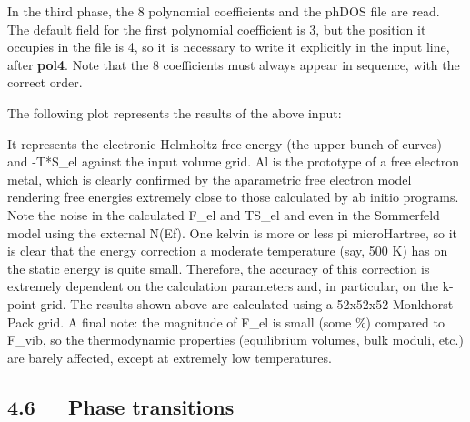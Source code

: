 \documentclass[a4paper]{article}
\begin{document}
In the third phase, the 8 polynomial coefficients and the phDOS file
are read. The default field for the first polynomial coefficient is 3,
but the position it occupies in the file is 4, so it is necessary to
write it explicitly in the input line, after \textbf{pol4}. Note that the 8
coefficients must always appear in sequence, with the correct order.

The following plot represents the results of the above input:

\noindent{}

It represents the electronic Helmholtz free energy (the upper bunch of
curves) and -T*S\_el against the input volume grid. Al is the prototype
of a free electron metal, which is clearly confirmed by the
aparametric free electron model rendering free energies extremely
close to those calculated by ab initio programs. Note the noise in the
calculated F\_el and TS\_el and even in the Sommerfeld model using the
external N(Ef). One kelvin is more or less pi microHartree, so it is
clear that the energy correction a moderate temperature (say, 500 K)
has on the static energy is quite small. Therefore, the accuracy of
this correction is extremely dependent on the calculation parameters
and, in particular, on the k-point grid. The results shown above are
calculated using a 52x52x52 Monkhorst-Pack grid. A final note: the
magnitude of F\_el is small (some \%) compared to F\_vib, so the
thermodynamic properties (equilibrium volumes, bulk moduli, etc.) are
barely affected, except at extremely low temperatures.


\subsection{4.6   Phase transitions%
  \label{phase-transitions}%
}
\end{document}
